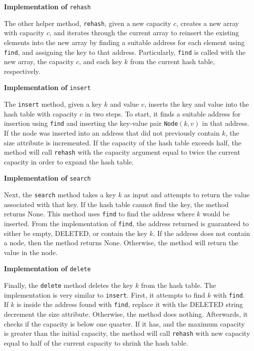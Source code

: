 \documentclass[11pt]{article}
\begin{document}
    \medskip

    \textbf{Implementation of} \texttt{rehash}

    The other helper method, \texttt{rehash}, given a new capacity \(c\), creates a new array with capacity \(c\), and iterates through the current array to reinsert the existing elements into the new array by finding a suitable address for each element using \texttt{find}, and assigning the key to that address. Particularly, \texttt{find} is called with the new array, the capacity \(c\), and each key \(k\) from the current hash table, respectively.

    \medskip

    \textbf{Implementation of} \texttt{insert}

    The \texttt{insert} method, given a key \(k\) and value \(v\), inserts the key and value into the hash table with capacity \(c\) in two steps. To start, it finds a suitable address for insertion using \texttt{find} and inserting the key-value pair \texttt{Node}\((k,v)\) in that address. If the node was inserted into an address that did not previously contain \(k\), the size attribute is incremented. If the capacity of the hash table exceeds half, the method will call \texttt{rehash} with the capacity argument equal to twice the current capacity in order to expand the hash table.

    \medskip

    \textbf{Implementation of} \texttt{search}

    Next, the \texttt{search} method takes a key \(k\) as input and attempts to return the value associated with that key. If the hash table cannot find the key, the method returns None. This method uses \texttt{find} to find the address where \(k\) would be inserted. From the implementation of \texttt{find}, the address returned is guaranteed to either be empty, DELETED, or contain the key \(k\). If the address does not contain a node, then the method returns None. Otherwise, the method will return the value in the node.

    \medskip

    \textbf{Implementation of} \texttt{delete}

    Finally, the \texttt{delete} method deletes the key \(k\) from the hash table. The implementation is very similar to \texttt{insert}. First, it attempts to find \(k\) with \texttt{find}. If \(k\) is inside the address found with \texttt{find}, replace it with the DELETED string decrement the size attribute. Otherwise, the method does nothing. Afterwards, it checks if the capacity is below one quarter. If it has, and the maximum capacity is greater than the initial capacity, the method will call \texttt{rehash} with new capacity equal to half of the current capacity to shrink the hash table.
\end{document}
